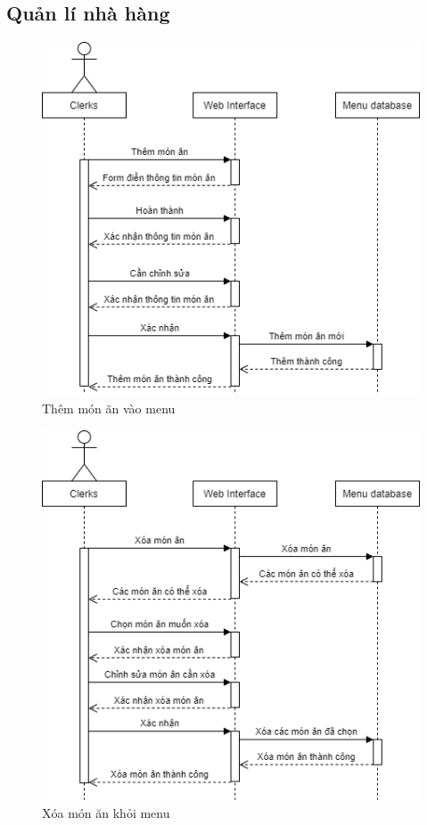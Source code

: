 \subsection{Quản lí nhà hàng}
\begin{figure}[!h]
    \begin{center}
        \includegraphics[scale=0.6]{Images/SequenceDiagram/SD_add.png}
    \end{center}
    \hspace{0.3cm}
    \caption{Thêm món ăn vào menu}
\end{figure}
\begin{figure}[!h]
    \begin{center}
        \includegraphics[scale=0.6]{Images/SequenceDiagram/SD_delete.png}
    \end{center}
    \hspace{0.3cm}
    \caption{Xóa món ăn khỏi menu}
\end{figure}
